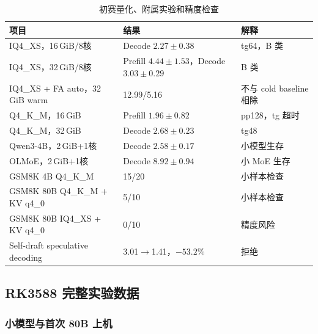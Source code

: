 \begin{table}[H]
  \centering
  \scriptsize
  \caption{初赛量化、附属实验和精度检查}
  \label{tab:appendix-preliminary-extra}
  \begin{tabular}{p{}p{}p{}}
    \toprule
    项目 & 结果 & 解释 \\
    \midrule
    IQ4\_XS，16\,GiB/8核 & Decode $2.27\pm0.38$ & tg64，B 类 \\
    IQ4\_XS，32\,GiB/8核 & Prefill $4.44\pm1.53$，Decode $3.03\pm0.29$ & B 类 \\
    IQ4\_XS + FA auto，32\,GiB warm & 12.99/5.16 & 不与 cold baseline 相除 \\
    Q4\_K\_M，16\,GiB & Prefill $1.96\pm0.82$ & pp128，tg 超时 \\
    Q4\_K\_M，32\,GiB & Decode $2.68\pm0.23$ & tg48 \\
    Qwen3-4B，2\,GiB+1核 & Decode $2.58\pm0.17$ & 小模型生存 \\
    OLMoE，2\,GiB+1核 & Decode $8.92\pm0.94$ & 小 MoE 生存 \\
    GSM8K 4B Q4\_K\_M & 15/20 & 小样本检查 \\
    GSM8K 80B Q4\_K\_M + KV q4\_0 & 5/10 & 小样本检查 \\
    GSM8K 80B IQ4\_XS + KV q4\_0 & 0/10 & 精度风险 \\
    Self-draft speculative decoding & 3.01$\rightarrow$1.41，$-53.2\%$ & 拒绝 \\
    \bottomrule
  \end{tabular}
\end{table}

\subsection{RK3588 完整实验数据}

\subsubsection{小模型与首次 80B 上机}

